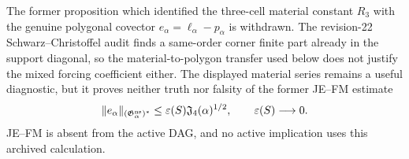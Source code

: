 \begin{remark}
\label{JP:rem:period-three-material-forcing}
The former proposition which identified the three-cell material constant
$R_3$ with the genuine polygonal covector
$e_\alpha=\ell_\alpha-p_\alpha$ is withdrawn.  The revision-22
Schwarz--Christoffel audit finds a same-order corner finite part already in
the support diagonal, so the material-to-polygon transfer used below does
not justify the mixed forcing coefficient either.  The displayed material
series remains a useful diagnostic, but it proves neither truth nor
falsity of the former JE--FM estimate
\begin{equation}\label{JP:eq:JE-FM}
 \|e_\alpha\|_{(\mathfrak G_\alpha^{\rm ns})^*}
 \le\varepsilon(S)\mathfrak J_4(\alpha)^{1/2},
 \qquad \varepsilon(S)\longrightarrow0.
\end{equation}
JE--FM is absent from the active
DAG, and no active implication uses this archived calculation.
\end{remark}


